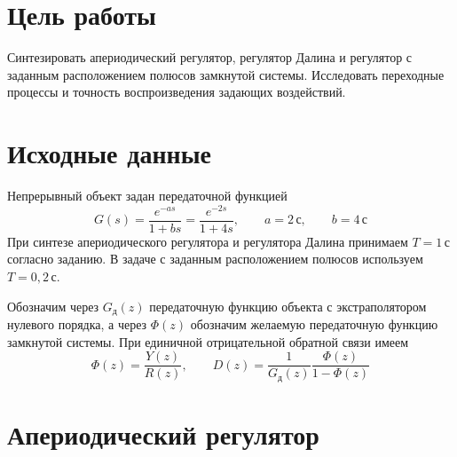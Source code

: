 
\setlength{\abovedisplayskip}{7pt}
\setlength{\belowdisplayskip}{7pt}
\setlength{\abovedisplayshortskip}{4pt}
\setlength{\belowdisplayshortskip}{4pt}

\makeatletter
\newenvironment{reportfigure}{%
  \par\addvspace{8pt}\noindent
  \begin{minipage}{\textwidth}
    \def\@captype{figure}%
    \centering
}{%
  \end{minipage}\par\vspace{4pt}
}
\makeatother

\tableofcontents
\newpage

\section{Цель работы}

Синтезировать апериодический регулятор, регулятор Далина и регулятор
с заданным расположением полюсов замкнутой системы. Исследовать
переходные процессы и точность воспроизведения задающих воздействий.

\section{Исходные данные}

Непрерывный объект задан передаточной функцией
\begin{equation}
  G(s)=\frac{e^{-as}}{1+bs}
      =\frac{e^{-2s}}{1+4s},
  \qquad a=2\,\text{с},\qquad b=4\,\text{с}
  \label{eq:continuous-plant}
\end{equation}
При синтезе апериодического регулятора и регулятора Далина принимаем
$T=1\,\text{с}$ согласно заданию. В задаче с заданным расположением
полюсов используем $T=0{,}2\,\text{с}$.

Обозначим через $G_{\text{д}}(z)$ передаточную функцию объекта
с экстраполятором нулевого порядка, а через $\Phi(z)$ обозначим
желаемую передаточную функцию замкнутой системы.
При единичной отрицательной обратной связи имеем
\begin{equation}
  \Phi(z)=\frac{Y(z)}{R(z)},
  \qquad D(z)=\frac{1}{G_{\text{д}}(z)}\frac{\Phi(z)}{1-\Phi(z)}
  \label{eq:controller-formula}
\end{equation}

\section{Апериодический регулятор}

